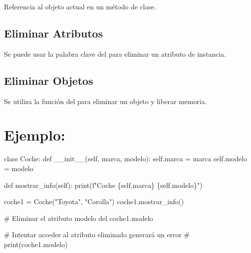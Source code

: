 \documentclass[
  a4paper,
  DIV=11,
  numbers=noendperiod,
  onepage,
  openany]{scrreprt}
\newenvironment{Shaded}{\begin{snugshade}}{\end{snugshade}}
\newcommand{\BuiltInTok}[1]{\textcolor[rgb]{0.00,0.23,0.31}{#1}}
\newcommand{\CommentTok}[1]{\textcolor[rgb]{0.37,0.37,0.37}{#1}}
\newcommand{\FunctionTok}[1]{\textcolor[rgb]{0.28,0.35,0.67}{#1}}
\newcommand{\KeywordTok}[1]{\textcolor[rgb]{0.00,0.23,0.31}{#1}}
\newcommand{\NormalTok}[1]{\textcolor[rgb]{0.00,0.23,0.31}{#1}}
\newcommand{\OperatorTok}[1]{\textcolor[rgb]{0.37,0.37,0.37}{#1}}
\newcommand{\SpecialCharTok}[1]{\textcolor[rgb]{0.37,0.37,0.37}{#1}}
\newcommand{\SpecialStringTok}[1]{\textcolor[rgb]{0.13,0.47,0.30}{#1}}
\newcommand{\StringTok}[1]{\textcolor[rgb]{0.13,0.47,0.30}{#1}}
\newcommand{\VariableTok}[1]{\textcolor[rgb]{0.07,0.07,0.07}{#1}}
\begin{document}
Referencia al objeto actual en un método de clase.

\hypertarget{eliminar-atributos}{%
\subsection{Eliminar Atributos}\label{eliminar-atributos}}

Se puede usar la palabra clave del para eliminar un atributo de
instancia.

\hypertarget{eliminar-objetos}{%
\subsection{Eliminar Objetos}\label{eliminar-objetos}}

Se utiliza la función del para eliminar un objeto y liberar memoria.

\hypertarget{ejemplo-54}{%
\section{Ejemplo:}\label{ejemplo-54}}

\begin{Shaded}
\begin{Highlighting}[]
\KeywordTok{class}\NormalTok{ Coche:}
    \KeywordTok{def} \FunctionTok{\_\_init\_\_}\NormalTok{(}\VariableTok{self}\NormalTok{, marca, modelo):}
        \VariableTok{self}\NormalTok{.marca }\OperatorTok{=}\NormalTok{ marca}
        \VariableTok{self}\NormalTok{.modelo }\OperatorTok{=}\NormalTok{ modelo}

    \KeywordTok{def}\NormalTok{ mostrar\_info(}\VariableTok{self}\NormalTok{):}
        \BuiltInTok{print}\NormalTok{(}\SpecialStringTok{f"Coche }\SpecialCharTok{\{}\VariableTok{self}\SpecialCharTok{.}\NormalTok{marca}\SpecialCharTok{\}}\SpecialStringTok{ }\SpecialCharTok{\{}\VariableTok{self}\SpecialCharTok{.}\NormalTok{modelo}\SpecialCharTok{\}}\SpecialStringTok{"}\NormalTok{)}

\NormalTok{coche1 }\OperatorTok{=}\NormalTok{ Coche(}\StringTok{"Toyota"}\NormalTok{, }\StringTok{"Corolla"}\NormalTok{)}
\NormalTok{coche1.mostrar\_info()}

\CommentTok{\# Eliminar el atributo \textquotesingle{}modelo\textquotesingle{}}
\KeywordTok{del}\NormalTok{ coche1.modelo}

\CommentTok{\# Intentar acceder al atributo eliminado generará un error}
\CommentTok{\# print(coche1.modelo)}
\end{Highlighting}
\end{Shaded}
\end{document}
